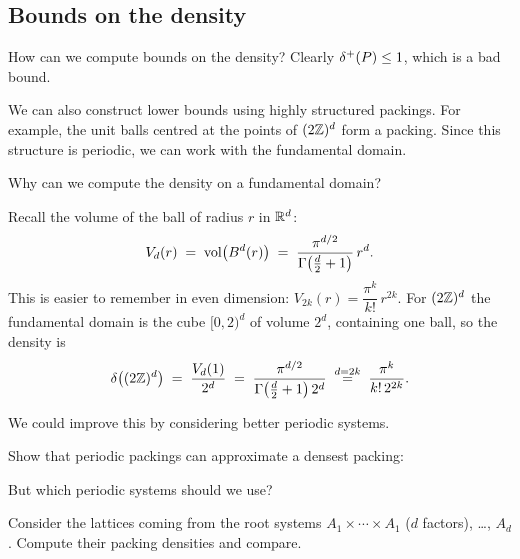 \subsection{Bounds on the density}

How can we compute bounds on the density? Clearly $\delta^+(P)\le 1$, which is a bad bound.

We can also construct lower bounds using highly structured packings. For example,
the unit balls centred at the points of $(2\mathbb{Z})^d$ form a packing. Since this structure
is periodic, we can work with the fundamental domain.

\begin{exercise}[Easy]
\label{L1:ex:periodic-density}
Why can we compute the density on a fundamental domain? 
\end{exercise}

Recall the volume of the ball of radius $r$ in $\mathbb{R}^d$:
\[
  V_d(r)\;=\;\operatorname{vol}\bigl(B^d(r)\bigr)\;=\;\frac{\pi^{d/2}}{\Gamma\!\left(\frac d2+1\right)}\,r^d .
\]
This is easier to remember in even dimension: $V_{2k}(r)=\dfrac{\pi^k}{k!}\,r^{2k}$.
For $(2\mathbb{Z})^d$ the fundamental domain is the cube $[0,2)^d$ of volume $2^d$, containing one
ball, so the density is
\[
  \delta\bigl((2\mathbb{Z})^d\bigr)\;=\;\frac{V_d(1)}{2^d}\;=\;\frac{\pi^{d/2}}{\Gamma\!\left(\frac d2+1\right)2^d}
  \;\overset{d=2k}{=}\;\frac{\pi^{k}}{k!\,2^{2k}} .
\]

We could improve this by considering better periodic systems.

\begin{exercise}[Easy]
\label{L1:ex:periodic-approx}
Show that periodic packings can approximate a densest packing: 
\end{exercise}

But which periodic systems should we use?

\begin{exercise}
\label{L1:ex:root-lattices}
Consider the lattices coming from the root systems $A_1\times\cdots\times A_1$
($d$ factors), \dots, $A_d$. Compute their packing densities and compare.
\end{exercise}

